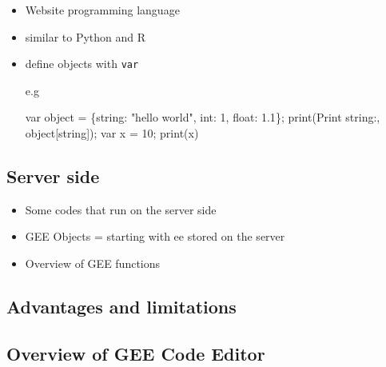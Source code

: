 \documentclass[
  letterpaper,
  DIV=11,
  numbers=noendperiod]{scrreprt}
\newenvironment{Shaded}{\begin{snugshade}}{\end{snugshade}}
\newcommand{\DataTypeTok}[1]{\textcolor[rgb]{0.68,0.00,0.00}{#1}}
\newcommand{\DecValTok}[1]{\textcolor[rgb]{0.68,0.00,0.00}{#1}}
\newcommand{\FloatTok}[1]{\textcolor[rgb]{0.68,0.00,0.00}{#1}}
\newcommand{\FunctionTok}[1]{\textcolor[rgb]{0.28,0.35,0.67}{#1}}
\newcommand{\KeywordTok}[1]{\textcolor[rgb]{0.00,0.23,0.31}{#1}}
\newcommand{\NormalTok}[1]{\textcolor[rgb]{0.00,0.23,0.31}{#1}}
\newcommand{\OperatorTok}[1]{\textcolor[rgb]{0.37,0.37,0.37}{#1}}
\newcommand{\StringTok}[1]{\textcolor[rgb]{0.13,0.47,0.30}{#1}}
\providecommand{\tightlist}{%
  \setlength{\itemsep}{0pt}\setlength{\parskip}{0pt}}\usepackage{longtable,booktabs,array}
\begin{document}
\begin{itemize}
\item
  Website programming language
\item
  similar to Python and R
\item
  define objects with \texttt{var}

  e.g

\begin{Shaded}
\begin{Highlighting}[]
\KeywordTok{var}\NormalTok{ object }\OperatorTok{=}\NormalTok{ \{}\DataTypeTok{string}\OperatorTok{:} \StringTok{"hello world"}\OperatorTok{,} \DataTypeTok{int}\OperatorTok{:} \DecValTok{1}\OperatorTok{,} \DataTypeTok{float}\OperatorTok{:} \FloatTok{1.1}\NormalTok{\}}\OperatorTok{;}
\FunctionTok{print}\NormalTok{(}\StringTok{\textquotesingle{}Print string:\textquotesingle{}}\OperatorTok{,}\NormalTok{ object[}\StringTok{\textquotesingle{}string\textquotesingle{}}\NormalTok{])}\OperatorTok{;}
\KeywordTok{var}\NormalTok{ x }\OperatorTok{=} \DecValTok{10}\OperatorTok{;}
\FunctionTok{print}\NormalTok{(x)}
\end{Highlighting}
\end{Shaded}
\end{itemize}

\hypertarget{server-side}{%
\subsection{Server side}\label{server-side}}

\begin{itemize}
\tightlist
\item
  Some codes that run on the server side
\item
  GEE Objects = starting with ee stored on the server
\item
  Overview of GEE functions
\end{itemize}

\hypertarget{advantages-and-limitations}{%
\subsection{Advantages and
limitations}\label{advantages-and-limitations}}

\hypertarget{overview-of-gee-code-editor}{%
\subsection{Overview of GEE Code
Editor}\label{overview-of-gee-code-editor}}
\end{document}
